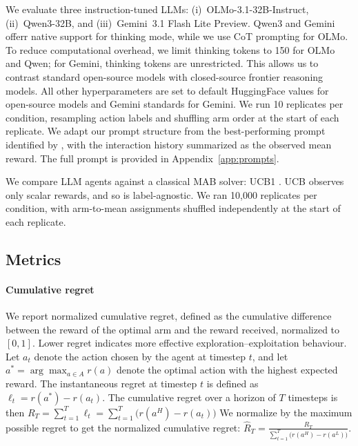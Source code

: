 \documentclass{article} %
\begin{document}
We evaluate three instruction-tuned LLMs: (i)~OLMo-3.1-32B-Instruct, (ii)~Qwen3-32B, and
(iii)~Gemini~3.1 Flash Lite Preview. Qwen3 and Gemini offerr native support for thinking mode, while we use CoT prompting for OLMo. To reduce computational overhead, we limit
thinking tokens to 150 for OLMo and Qwen; for Gemini, thinking tokens are
unrestricted. This allows us to contrast standard open-source models with closed-source frontier reasoning models. All other hyperparameters are set to default HuggingFace values for open-source models and Gemini standards for Gemini. We run 10 replicates per condition, resampling action labels and shuffling arm order at the start of each replicate. We adapt our prompt structure from the best-performing prompt identified by \citet{krishna_icl}, with the interaction history summarized as the observed mean reward. The full prompt is provided in Appendix~\ref{app:prompts}.

We compare LLM agents against a classical MAB solver: UCB1 \citep{auer_ucb_2002}. UCB observes only scalar rewards, and so is label-agnostic. We ran 10,000 replicates per condition, with arm-to-mean assignments shuffled independently at the start of each replicate. 


\subsection{Metrics}
\label{sec:metrics}

\paragraph{Cumulative regret}
We report normalized cumulative regret, defined as the cumulative difference between
the reward of the optimal arm and the reward received, normalized to $[0, 1]$. Lower
regret indicates more effective exploration--exploitation behaviour. Let $a_t$ denote the action chosen by the agent at timestep $t$, and let $a^* = \arg\max_{a \in A} r(a)$ denote the optimal action with the highest expected reward. The instantaneous regret at timestep $t$ is defined as $\ell_t = r(a^*) - r(a_t)$. The cumulative regret over a horizon of $T$ timesteps is then $R_T = \sum_{t=1}^{T} \ell_t = \sum_{t=1}^{T} \bigl(r(a^H) - r(a_t)\bigr)$
We normalize by the maximum possible regret to get the normalized cumulative regret:
$\hat{R}_T = \frac{R_T}{\sum_{t=1}^{T} \bigl(r(a^H) - r(a^L)\bigr)}$.
\end{document}
